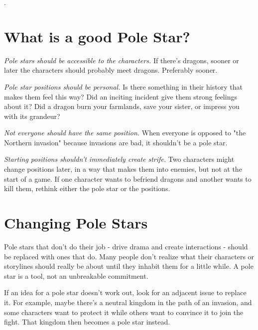 \documentclass[10pt,oneside,letterpaper,landscape]{memoir}
\begin{document}
\begin{multicols}{3}
\vfill\null %

\columnbreak

{\color{white}.}
\vspace{19mm}

\section{What is a good Pole Star?}

\textit{Pole stars should be accessible to the characters.} If there's dragons, sooner or later the characters should probably meet dragons. Preferably sooner.

\textit{Pole star positions should be personal.} Is there something in their history that makes them feel this way? Did an inciting incident give them strong feelings about it? Did a dragon burn your farmlands, save your sister, or impress you with its grandeur?

\textit{Not everyone should have the same position.} When everyone is opposed to "the Northern invasion" because invasions are bad, it shouldn't be a pole star.

\textit{Starting positions shouldn't immediately create strife.} Two characters might change positions later, in a way that makes them into enemies, but not at the start of a game. If one character wants to befriend dragons and another wants to kill them, rethink either the pole star or the positions.

\section{Changing Pole Stars}

Pole stars that don't do their job - drive drama and create interactions - should be replaced with ones that do. Many people don't realize what their characters or storylines should really be about until they inhabit them for a little while. A pole star is a tool, not an unbreakable commitment.

If an idea for a pole star doesn't work out, look for an adjacent issue to replace it. For example, maybe there's a neutral kingdom in the path of an invasion, and some characters want to protect it while others want to convince it to join the fight. That kingdom then becomes a pole star instead.


\end{multicols}
\end{document}
